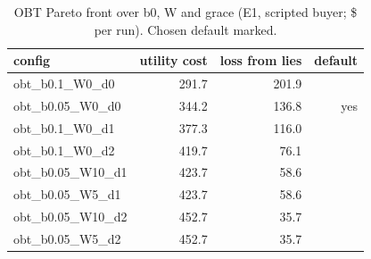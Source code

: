 \begin{table}[t]
\centering
\small
\caption{OBT Pareto front over b0, W and grace (E1, scripted buyer; \$ per run). Chosen default marked.}
\label{tab:e1_obt_front}
\begin{tabular}{lrrr}
\toprule
config & utility cost & loss from lies & default \\
\midrule
obt\_b0.1\_W0\_d0 & 291.7 & 201.9 &  \\
obt\_b0.05\_W0\_d0 & 344.2 & 136.8 & yes \\
obt\_b0.1\_W0\_d1 & 377.3 & 116.0 &  \\
obt\_b0.1\_W0\_d2 & 419.7 & 76.1 &  \\
obt\_b0.05\_W10\_d1 & 423.7 & 58.6 &  \\
obt\_b0.05\_W5\_d1 & 423.7 & 58.6 &  \\
obt\_b0.05\_W10\_d2 & 452.7 & 35.7 &  \\
obt\_b0.05\_W5\_d2 & 452.7 & 35.7 &  \\
\bottomrule
\end{tabular}
\end{table}
